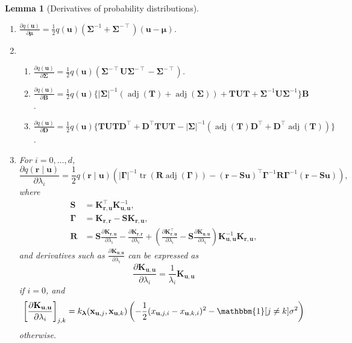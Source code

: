 \documentclass{article}
\newtheorem{lemma}[theorem]{Lemma}
\theoremstyle{definition}
\theoremstyle{remark}
\DeclareMathOperator{\tr}{tr}
\DeclareMathOperator{\adj}{adj}
\newcommand{\Kuu}{\mathbf{K}_{\mathbf{u},\mathbf{u}}}
\newcommand{\Krr}{\mathbf{K}_{\mathbf{r},\mathbf{r}}}
\newcommand{\Kru}{\mathbf{K}_{\mathbf{r},\mathbf{u}}}
\begin{document}
\begin{lemma}[Derivatives of probability
  distributions] \label{lemma:derivatives}
  \begin{enumerate}
    \leavevmode
  \item $\frac{\partial q(\mathbf{u})}{\partial \bm\mu} =
    \frac{1}{2}q(\mathbf{u})(\bm\Sigma^{-1} + \bm\Sigma^{-\intercal})(\mathbf{u}
    - \bm\mu)$.
  \item
    \begin{enumerate}
    \item
      $\frac{\partial q(\mathbf{u})}{\partial \bm\Sigma} =
      \frac{1}{2}q(\mathbf{u})(\bm\Sigma^{-\intercal}\mathbf{U}\bm\Sigma^{-\intercal}
      - \bm\Sigma^{-\intercal})$.
    \item
      $\frac{\partial q(\mathbf{u})}{\partial \mathbf{B}} =
      \frac{1}{2}q(\mathbf{u}) \{ |\bm\Sigma|^{-1}(\adj(\mathbf{T}) +
      \adj(\bm\Sigma)) + \mathbf{TUT} +
      \bm\Sigma^{-1}\mathbf{U}\bm\Sigma^{-1} \} \mathbf{B}$.
    \item
      $\frac{\partial q(\mathbf{u})}{\partial \mathbf{D}} =
      \frac{1}{2}q(\mathbf{u}) \{ \mathbf{T}\mathbf{UT}\mathbf{D}^\intercal +
      \mathbf{D}^\intercal\mathbf{T}\mathbf{UT} -
      |\bm\Sigma|^{-1}(\adj(\mathbf{T})\mathbf{D}^\intercal +
      \mathbf{D}^\intercal \adj(\mathbf{T})) \}$.
    \end{enumerate}
  \item For $i = 0, \dots, d$,
    \[
      \frac{\partial q(\mathbf{r} \mid \mathbf{u})}{\partial \lambda_i} =
      \frac{1}{2}q(\mathbf{r} \mid \mathbf{u}) \left( |\bm\Gamma|^{-1}
        \tr(\mathbf{R} \adj(\bm\Gamma)) - (\mathbf{r} -
        \mathbf{Su})^\intercal\bm\Gamma^{-1}\mathbf{R}\bm\Gamma^{-1}(\mathbf{r}
        - \mathbf{Su}) \right),
    \]
    where %
    \begin{align*}
      \mathbf{S} &= \Kru^\intercal\Kuu^{-1}, \\
      \bm\Gamma &= \Krr - \mathbf{S}\Kru, \\
      \mathbf{R} &= \mathbf{S}\frac{\partial \Kru}{\partial \lambda_i} - \frac{\partial \Krr}{\partial \lambda_i} + \left( \frac{\partial \Kru^\intercal}{\partial \lambda_i} - \mathbf{S}\frac{\partial \Kuu}{\partial \lambda_i} \right) \Kuu^{-1}\Kru,
    \end{align*}
    and derivatives such as $\frac{\partial \Kuu}{\partial \lambda_i}$ can be
    expressed as
    \[
      \frac{\partial \Kuu}{\partial \lambda_i} = \frac{1}{\lambda_i}\Kuu
    \]
    if $i = 0$, and
    \[
      \left[ \frac{\partial \Kuu}{\partial \lambda_i} \right]_{j,k} =
      k_{\bm\lambda}(\mathbf{x}_{\mathbf{u},j}, \mathbf{x}_{\mathbf{u},k})
      \left( -\frac{1}{2}(x_{\mathbf{u},j,i} - x_{\mathbf{u},k,i})^2 -
        \mathbbm{1}[j \ne k]\sigma^2 \right)
    \]
    otherwise.
  \end{enumerate}
\end{lemma}
\end{document}
